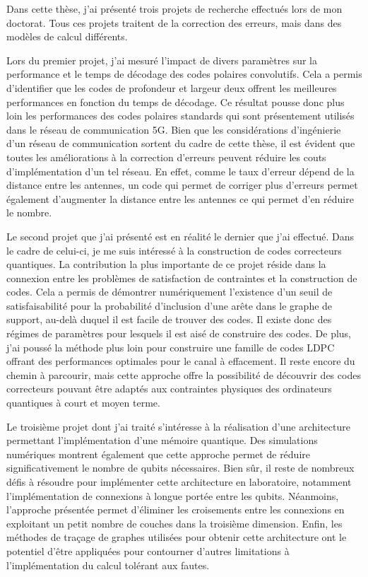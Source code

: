 \begin{comment}
\end{comment}

\Conclusion %

Dans cette thèse,
j'ai présenté trois projets de recherche effectués lors de mon doctorat.
Tous ces projets traitent de la correction des erreurs,
mais dans des modèles de calcul différents.

Lors du premier projet,
j'ai mesuré l'impact de divers paramètres sur la performance et le temps de décodage
des codes polaires convolutifs.
Cela a permis d'identifier que les codes de profondeur et largeur deux offrent les
meilleures performances en fonction du temps de décodage.
Ce résultat pousse donc plus loin les performances des codes polaires standards
qui sont présentement utilisés dans le réseau de communication 5G.
Bien que les considérations d'ingénierie d'un réseau de communication sortent du cadre de cette thèse,
il est évident que toutes les améliorations à la correction d'erreurs peuvent réduire les 
couts d'implémentation d'un tel réseau.
En effet,
comme le taux d'erreur dépend de la distance entre les antennes,
un code qui permet de corriger plus d'erreurs permet également d'augmenter la distance
entre les antennes ce qui permet d'en réduire le nombre.

Le second projet que j'ai présenté est en réalité le dernier que j'ai effectué.
Dans le cadre de celui-ci,
je me suis intéressé à la construction de codes correcteurs quantiques.
La contribution la plus importante de ce projet réside dans la connexion
entre les problèmes de satisfaction de contraintes et la construction de codes.
Cela a permis de démontrer numériquement l'existence d'un seuil de satisfaisabilité
pour la probabilité d'inclusion d'une arête dans le graphe de support,
au-delà duquel il est facile de trouver des codes.
Il existe donc des régimes de paramètres pour lesquels il est aisé de construire des codes.
De plus,
j'ai poussé la méthode plus loin pour construire une famille de codes LDPC offrant des 
performances optimales pour le canal à effacement.
Il reste encore du chemin à parcourir,
mais cette approche offre la possibilité de découvrir des codes correcteurs pouvant être
adaptés aux contraintes physiques des ordinateurs quantiques à court et moyen terme.

Le troisième projet dont j'ai traité s'intéresse à la réalisation d'une architecture
permettant l'implémentation d'une mémoire quantique.
Des simulations numériques montrent également que cette approche permet de réduire significativement
le nombre de qubits nécessaires.
Bien sûr,
il reste de nombreux défis à résoudre pour implémenter cette architecture en laboratoire,
notamment l'implémentation de connexions à longue portée entre les qubits.
Néanmoins,
l'approche présentée permet d'éliminer les croisements entre les connexions en exploitant
un petit nombre de couches dans la troisième dimension.
Enfin,
les méthodes de traçage de graphes utilisées pour obtenir cette architecture 
ont le potentiel d'être appliquées pour contourner d'autres limitations à l'implémentation
du calcul tolérant aux fautes.

